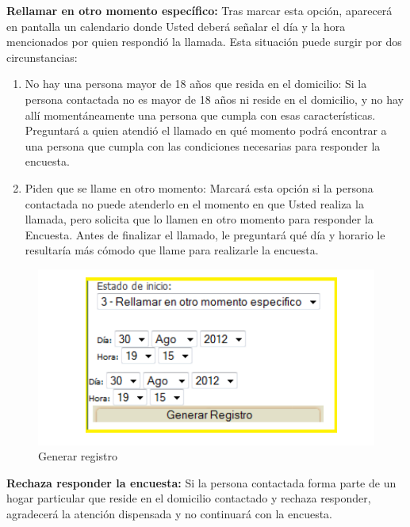 \documentclass[
  openany]{book}
\begin{document}
\textbf{Rellamar en otro momento específico:} Tras marcar esta opción, aparecerá en pantalla un calendario donde Usted deberá señalar el día y la hora mencionados por quien respondió la llamada. Esta situación puede surgir por dos circunstancias:

\begin{enumerate}
\def\labelenumi{\arabic{enumi}.}
\item
  No hay una persona mayor de 18 años que resida en el domicilio: Si la persona contactada no es mayor de 18 años ni reside en el domicilio, y no hay allí momentáneamente una persona que cumpla con esas características. Preguntará a quien atendió el llamado en qué momento podrá encontrar a una persona que cumpla con las condiciones necesarias para responder la encuesta.
\item
  Piden que se llame en otro momento: Marcará esta opción si la persona contactada no puede atenderlo en el momento en que Usted realiza la llamada, pero solicita que lo llamen en otro momento para responder la Encuesta. Antes de finalizar el llamado, le preguntará qué día y horario le resultaría más cómodo que llame para realizarle la encuesta.
\end{enumerate}

\begin{figure}

{\centering \includegraphics[width=1\linewidth]{imagenes/figura6-41} 

}

\caption{Generar registro}\label{fig:rellamar}
\end{figure}

\textbf{Rechaza responder la encuesta:} Si la persona contactada forma parte de un hogar particular que reside en el domicilio contactado y rechaza responder, agradecerá la atención dispensada y no continuará con la encuesta.
\end{document}
